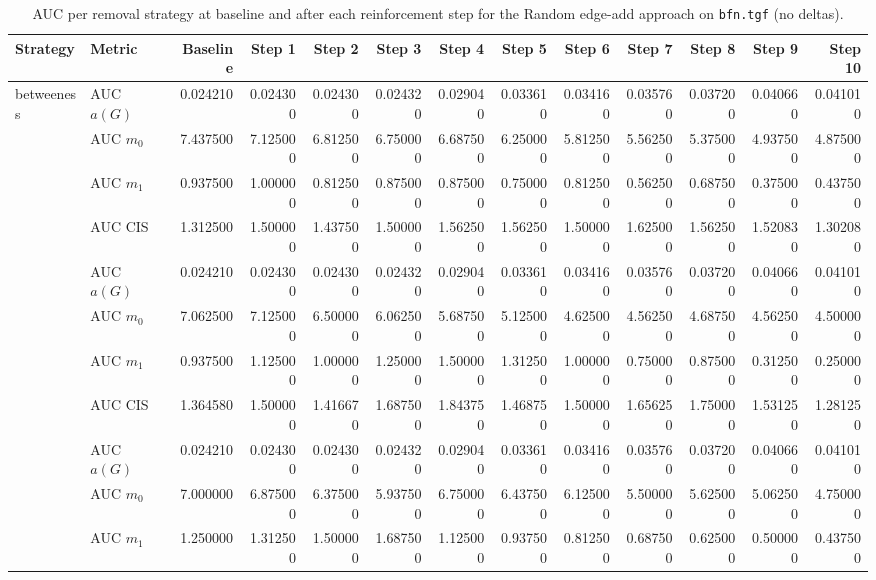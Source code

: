 \begin{table}[htbp]
  \centering
  \caption{AUC per removal strategy at baseline and after each reinforcement step for the Random edge-add approach on \texttt{bfn.tgf} (no deltas).}
  \label{tab:bfn-random_add-auc}
\setlength{\tabcolsep}{2.5pt}
  \begin{tabular}{llrrrrrrrrrrr}
    \toprule
    \textbf{Strategy} & \textbf{Metric} & \textbf{Baseline} & \textbf{Step 1} & \textbf{Step 2} & \textbf{Step 3} & \textbf{Step 4} & \textbf{Step 5} & \textbf{Step 6} & \textbf{Step 7} & \textbf{Step 8} & \textbf{Step 9} & \textbf{Step 10} \\
    \midrule
    \multirow{4}{*}{betweeness} & AUC $a(G)$ & 0.024210 & 0.024300 & 0.024300 & 0.024320 & 0.029040 & 0.033610 & 0.034160 & 0.035760 & 0.037200 & 0.040660 & 0.041010 \\
    & AUC $m_0$ & 7.437500 & 7.125000 & 6.812500 & 6.750000 & 6.687500 & 6.250000 & 5.812500 & 5.562500 & 5.375000 & 4.937500 & 4.875000 \\
    & AUC $m_1$ & 0.937500 & 1.000000 & 0.812500 & 0.875000 & 0.875000 & 0.750000 & 0.812500 & 0.562500 & 0.687500 & 0.375000 & 0.437500 \\
    & AUC CIS & 1.312500 & 1.500000 & 1.437500 & 1.500000 & 1.562500 & 1.562500 & 1.500000 & 1.625000 & 1.562500 & 1.520830 & 1.302080 \\
    \addlinespace
    \multirow{4}{*}{closeness} & AUC $a(G)$ & 0.024210 & 0.024300 & 0.024300 & 0.024320 & 0.029040 & 0.033610 & 0.034160 & 0.035760 & 0.037200 & 0.040660 & 0.041010 \\
    & AUC $m_0$ & 7.062500 & 7.125000 & 6.500000 & 6.062500 & 5.687500 & 5.125000 & 4.625000 & 4.562500 & 4.687500 & 4.562500 & 4.500000 \\
    & AUC $m_1$ & 0.937500 & 1.125000 & 1.000000 & 1.250000 & 1.500000 & 1.312500 & 1.000000 & 0.750000 & 0.875000 & 0.312500 & 0.250000 \\
    & AUC CIS & 1.364580 & 1.500000 & 1.416670 & 1.687500 & 1.843750 & 1.468750 & 1.500000 & 1.656250 & 1.750000 & 1.531250 & 1.281250 \\
    \addlinespace
    \multirow{4}{*}{core influence} & AUC $a(G)$ & 0.024210 & 0.024300 & 0.024300 & 0.024320 & 0.029040 & 0.033610 & 0.034160 & 0.035760 & 0.037200 & 0.040660 & 0.041010 \\
    & AUC $m_0$ & 7.000000 & 6.875000 & 6.375000 & 5.937500 & 6.750000 & 6.437500 & 6.125000 & 5.500000 & 5.625000 & 5.062500 & 4.750000 \\
    & AUC $m_1$ & 1.250000 & 1.312500 & 1.500000 & 1.687500 & 1.125000 & 0.937500 & 0.812500 & 0.687500 & 0.625000 & 0.500000 & 0.437500 \\

\end{tabular}
\end{table}
